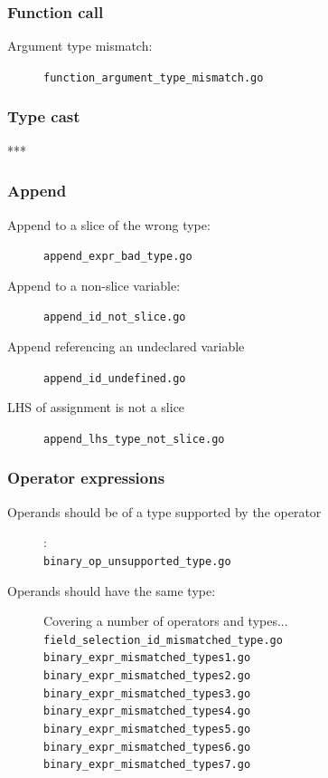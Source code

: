 \documentclass[oneside]{article}
\begin{document}
\subsubsection{Function call}
\begin{description}
  \item[Argument type mismatch:] \verb|function_argument_type_mismatch.go|
\end{description}

\subsubsection{Type cast}
***

\subsubsection{Append}
\begin{description}
  \item[Append to a slice of the wrong type:] \verb|append_expr_bad_type.go|
  \item[Append to a non-slice variable:] \verb|append_id_not_slice.go|
  \item[Append referencing an undeclared variable] \verb|append_id_undefined.go|
  \item[LHS of assignment is not a slice] \verb|append_lhs_type_not_slice.go|
\end{description}

\subsubsection{Operator expressions}
\begin{description}
  \item[Operands should be of a type supported by the operator]: \\
    \verb|binary_op_unsupported_type.go|
  \item[Operands should have the same type:] Covering a number of operators and types...\\
    \verb|field_selection_id_mismatched_type.go|\\
    \verb|binary_expr_mismatched_types1.go|\\
    \verb|binary_expr_mismatched_types2.go|\\
    \verb|binary_expr_mismatched_types3.go|\\
    \verb|binary_expr_mismatched_types4.go|\\
    \verb|binary_expr_mismatched_types5.go|\\
    \verb|binary_expr_mismatched_types6.go|\\
    \verb|binary_expr_mismatched_types7.go|
\end{description}
\end{document}
